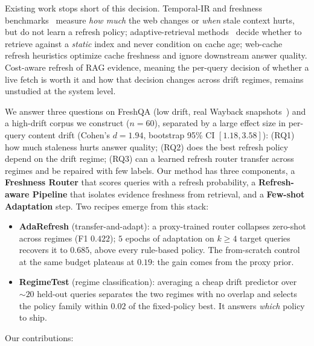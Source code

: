 \documentclass[pdflatex,sn-basic]{sn-jnl}
\begin{document}
Existing work stops short of this decision. Temporal-IR and freshness benchmarks~\cite{vu2023freshqa} measure \emph{how much} the web changes or \emph{when} stale context hurts, but do not learn a refresh policy; adaptive-retrieval methods~\cite{jiang2023flare,asai2023selfrag} decide whether to retrieve against a \emph{static} index and never condition on cache age; web-cache refresh heuristics optimize cache freshness and ignore downstream answer quality. Cost-aware refresh of RAG evidence, meaning the per-query decision of whether a live fetch is worth it and how that decision changes across drift regimes, remains unstudied at the system level.

We answer three questions on FreshQA (low drift, real Wayback snapshots~\cite{vu2023freshqa}) and a high-drift corpus we construct ($n{=}60$), separated by a large effect size in per-query content drift (Cohen's $d{=}1.94$, bootstrap 95\% CI $[1.18, 3.58]$): (RQ1) how much staleness hurts answer quality; (RQ2) does the best refresh policy depend on the drift regime; (RQ3) can a learned refresh router transfer across regimes and be repaired with few labels. Our method has three components, a \textbf{Freshness Router} that scores queries with a refresh probability, a \textbf{Refresh-aware Pipeline} that isolates evidence freshness from retrieval, and a \textbf{Few-shot Adaptation} step. Two recipes emerge from this stack:
\begin{itemize}
  \item \textbf{AdaRefresh} (transfer-and-adapt): a proxy-trained router collapses zero-shot across regimes (F1 $0.422$); $5$ epochs of adaptation on $k{\ge}4$ target queries recovers it to $0.685$, above every rule-based policy. The from-scratch control at the same budget plateaus at $0.19$: the gain comes from the proxy prior.
  \item \textbf{RegimeTest} (regime classification): averaging a cheap drift predictor over ${\sim}20$ held-out queries separates the two regimes with no overlap and selects the policy family within $0.02$ of the fixed-policy best. It answers \emph{which} policy to ship.
\end{itemize}

Our contributions:
\end{document}

